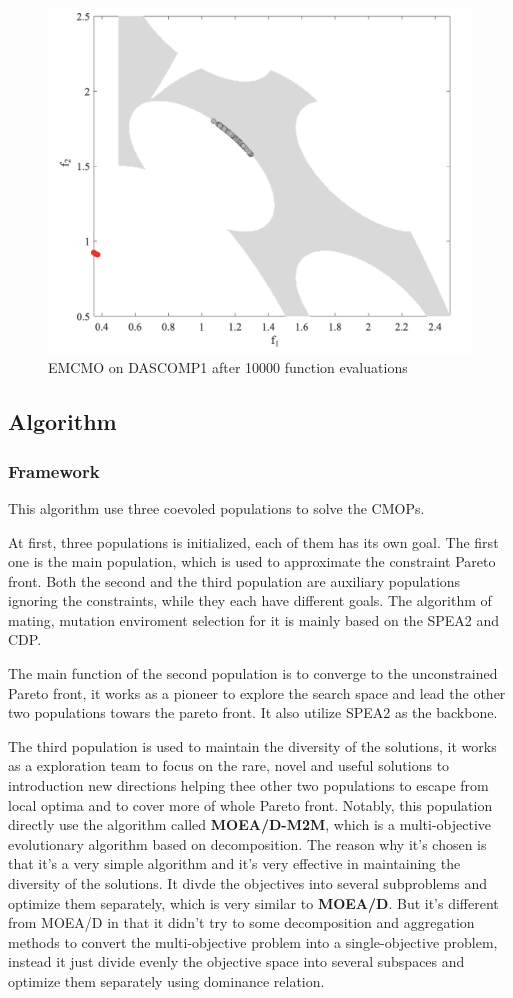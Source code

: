 \documentclass[sigconf]{acmart}
\begin{document}
\begin{figure}[h]
  \centering
  \includegraphics[width=0.7\linewidth]{fig/dascomp1}
  \caption{EMCMO on DASCOMP1 after 10000 function evaluations}
  \label{fig:dascomp1}
\end{figure}




\subsection{Algorithm}
\label{sec:algorithm}
\subsubsection{Framework}
This algorithm use three coevoled populations to solve the CMOPs.

At first, three populations is initialized, each of them has its own goal. The first one is the main population, which is used to approximate the constraint Pareto front. Both the second and the third population are auxiliary populations ignoring the constraints, while they each have different goals. The algorithm of mating, mutation enviroment selection for it is mainly based on the SPEA2 and CDP.

The main function of the second population is to converge to the unconstrained Pareto front, it works as a pioneer to explore the search space and lead the other two populations towars the pareto front. It also utilize SPEA2 as the backbone.

The third population is used to maintain the diversity of the solutions, it works as a exploration team to focus on the rare, novel and useful solutions to introduction new directions helping thee other two populations to escape from local optima and to cover more of whole Pareto front. Notably, this population directly use the algorithm called {\bf MOEA/D-M2M}\cite[m2m]{m2m}, which is a multi-objective evolutionary algorithm based on decomposition. The reason why it's chosen is that it's a very simple algorithm and it's very effective in maintaining the diversity of the solutions. It divde the objectives into several subproblems and optimize them separately, which is very similar to {\bf MOEA/D}\cite{moead}. But it's different from MOEA/D in that it didn't try to some decomposition and aggregation methods to convert the multi-objective problem into a single-objective problem, instead it just divide evenly the objective space into several subspaces and optimize them separately using dominance relation.
\end{document}
